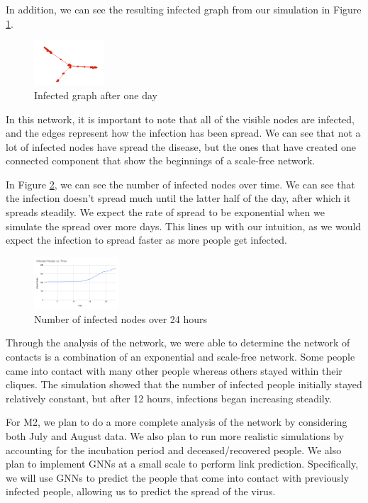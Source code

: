 \documentclass[times, 10pt,twocolumn]{article}
\begin{document}
In addition, we can see the resulting infected graph from our simulation in Figure \ref{fig:my_label2}.
\begin{figure}
    \centering
    \includegraphics[width=0.23\textwidth]{imgs/simulation.png}
    \caption{Infected graph after one day}
    \label{fig:my_label2}
\end{figure}
In this network, it is important to note that all of the visible nodes are infected, and the edges represent how the infection has been spread. We can see that not a lot of infected nodes have spread the disease, but the ones that have created one connected component that show the beginnings of a scale-free network. 

In Figure \ref{fig:my_label3}, we can see the number of infected nodes over time. We can see that the infection doesn't spread much until the latter half of the day, after which it spreads steadily. We expect the rate of spread to be exponential when we simulate the spread over more days. This lines up with our intuition, as we would expect the infection to spread faster as more people get infected.
\begin{figure}
    \centering
    \includegraphics[width=0.28\textwidth]{imgs/infected_over_time.png}
    \caption{Number of infected nodes over 24 hours}
    \label{fig:my_label3}
\end{figure}


Through the analysis of the network, we were able to determine the network of contacts is a combination of an exponential and scale-free network. Some people came into contact with many other people whereas others stayed within their cliques. The simulation showed that the number of infected people initially stayed relatively constant, but after 12 hours, infections began increasing steadily.

For M2, we plan to do a more complete analysis of the network by considering both July and August data. We also plan to run more realistic simulations by accounting for the incubation period and deceased/recovered people. We also plan to implement GNNs at a small scale to perform link prediction. Specifically, we will use GNNs to predict the people that come into contact with previously infected people, allowing us to predict the spread of the virus.
\end{document}
